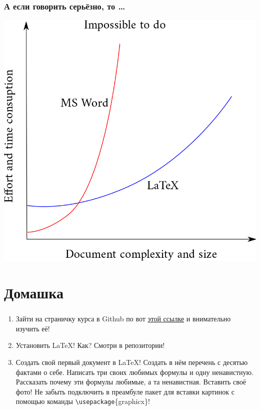 \documentclass[newPxFont]{beamer}
\begin{document}
\begin{frame}
\frametitle{А если говорить серьёзно, то \ldots} 
    \centering
    \includegraphics[scale=0.2]{latexvsword.png}
\end{frame}


\section{Домашка}

\begin{frame}[fragile]
\frametitle{\insertsection} 
\begin{enumerate}
\item Зайти на страничку курса в Github по вот {\color{blue} \href{https://github.com/FUlyankin/LaTeX/wiki}{этой ссылке}} и внимательно изучить её! 
\item Установить \LaTeX{}! Как? Смотри в репозитории! 
\item Создать свой первый документ в \LaTeX! Создать в нём перечень с       десятью фактами о себе. Написать три своих любимых формулы и одну ненавистную.      Рассказать почему эти формулы любимые, а та ненавистная. Вставить своё фото!  Не забыть подключить в преамбуле пакет для вставки картинок с помощью команды \verb|\usepackage|\{graphicx\}!
\end{enumerate}
\end{frame}
\end{document}
